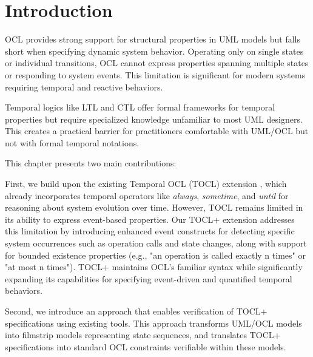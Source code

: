 \section{Introduction}

\hspace{1cm} OCL provides strong support for structural properties in UML models but 
falls short when specifying dynamic system behavior. Operating only on single states 
or individual transitions, OCL cannot express properties spanning multiple states or 
responding to system events. This limitation is significant for modern systems 
requiring temporal and reactive behaviors.

Temporal logics like LTL \cite{LTL} and CTL offer formal frameworks for temporal properties but 
require specialized knowledge unfamiliar to most UML designers. This creates a practical 
barrier for practitioners comfortable with UML/OCL but not with formal temporal notations.

This chapter presents two main contributions:

First, we build upon the existing Temporal OCL (TOCL) extension \cite{TOCL}, which already 
incorporates temporal operators like \textit{always}, \textit{sometime}, and 
\textit{until} for reasoning about system evolution over time. However, TOCL remains 
limited in its ability to express event-based properties. Our TOCL+ extension 
addresses this limitation by introducing enhanced event constructs for detecting 
specific system occurrences such as operation calls and state changes, along with 
support for bounded existence properties (e.g., "an operation is called exactly n 
times" or "at most n times"). TOCL+ maintains OCL's familiar syntax while 
significantly expanding its capabilities for specifying event-driven and quantified 
temporal behaviors.

Second, we introduce an approach that enables verification of TOCL+ 
specifications using existing tools. This approach transforms UML/OCL models into 
filmstrip models representing state sequences, and translates TOCL+ specifications 
into standard OCL constraints verifiable within these models.

